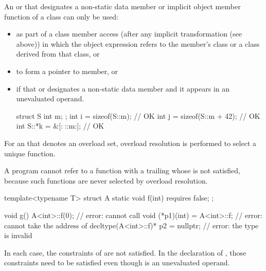 \pnum
An  or 
that designates a non-static data member or
implicit object member function of a class can only be used:
\begin{itemize}
\item as part of a class member access
(after any implicit transformation (see above))
in which the
object expression
refers to the member's class
or a class derived from
that class, or

\item to form a pointer to member, or

\item if that  or 
designates a non-static data member
and it appears in an unevaluated operand.
\begin{example}
\begin{codeblock}
struct S {
  int m;
};
int i = sizeof(S::m);           // OK
int j = sizeof(S::m + 42);      // OK
int S::*k = &[:^^S::m:];        // OK
\end{codeblock}
\end{example}
\end{itemize}

\pnum
For an  that denotes an overload set,
overload resolution is performed
to select a unique function.
\begin{note}
A program cannot refer to a function
with a trailing 
whose  is not satisfied,
because such functions are never selected by overload resolution.
\begin{example}
\begin{codeblock}
template<typename T> struct A {
  static void f(int) requires false;
};

void g() {
  A<int>::f(0);                         // error: cannot call 
  void (*p1)(int) = A<int>::f;          // error: cannot take the address of 
  decltype(A<int>::f)* p2 = nullptr;    // error: the type  is invalid
}
\end{codeblock}
In each case, the constraints of  are not satisfied.
In the declaration of ,
those constraints need to be satisfied
even though
 is an unevaluated operand.
\end{example}
\end{note}

